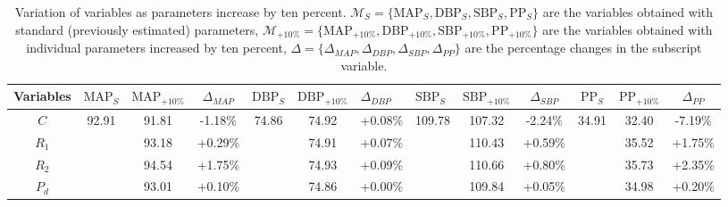 \begin{landscape}
\begin{table}
\centering
\begin{tabular}{ccccccccccccc}
\hline
\textbf{Variables} &
  \textbf{$\text{MAP}_S$} &
  \textbf{$\text{MAP}_{+10\%}$} &
  \textbf{$\Delta_{MAP}$} &
  \textbf{$\text{DBP}_S$} &
  \multicolumn{1}{l}{\textbf{$\text{DBP}_{+10\%}$}} &
  \multicolumn{1}{l}{\textbf{$\Delta_{DBP}$}} &
  \multicolumn{1}{l}{\textbf{$\text{SBP}_S$}} &
  \multicolumn{1}{l}{\textbf{$\text{SBP}_{+10\%}$}} &
  \textbf{$\Delta_{SBP}$} &
  \textbf{$\text{PP}_S$} &
  \textbf{$\text{PP}_{+10\%}$} &
  \textbf{$\Delta_{PP}$} \\ \hline
\textbf{$C$} &
  \multirow{4}{*}{92.91} &
  91.81 &
  -1.18\% &
  \multirow{4}{*}{74.86} &
  74.92 &
  +0.08\% &
  \multirow{4}{*}{109.78} &
  107.32 &
  -2.24\% &
  \multirow{4}{*}{34.91} &
  32.40 &
  -7.19\% \\
\textbf{$R_1$} &
   &
  93.18 &
  +0.29\% &
   &
  74.91 &
  +0.07\% &
   &
  110.43 &
  +0.59\% &
   &
  35.52 &
  +1.75\% \\
\textbf{$R_2$} &
   &
  94.54 &
  +1.75\% &
   &
  74.93 &
  +0.09\% &
   &
  110.66 &
  +0.80\% &
   &
  35.73 &
  +2.35\% \\
\textbf{$P_d$} &
   &
  93.01 &
  +0.10\% &
   &
  74.86 &
  +0.00\% &
   &
  109.84 &
  +0.05\% &
   &
  34.98 &
  +0.20\% \\ \hline
\end{tabular}
\caption{Variation of variables as parameters increase by ten percent. $\mathcal{M}_S=\{\text{MAP}_S, \text{DBP}_S, \text{SBP}_S, \text{PP}_S\}$ are the variables obtained with standard (previously estimated) parameters, $\mathcal{M}_{+10\%}=\{\text{MAP}_{+10\%}, \text{DBP}_{+10\%}, \text{SBP}_{+10\%}, \text{PP}_{+10\%}\}$ are the variables obtained with individual parameters increased by ten percent, $\Delta=\{\Delta_{MAP}, \Delta_{DBP}, \Delta_{SBP}, \Delta_{PP}\}$ are the percentage changes in the subscript variable.}
\label{tab:VariazioneParametri-Variabili}
\end{table}
\end{landscape}